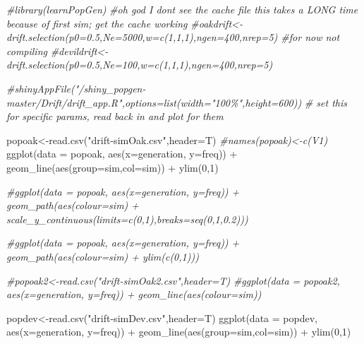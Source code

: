 \documentclass[
]{article}
\newenvironment{Shaded}{\begin{snugshade}}{\end{snugshade}}
\newcommand{\AttributeTok}[1]{\textcolor[rgb]{0.77,0.63,0.00}{#1}}
\newcommand{\CommentTok}[1]{\textcolor[rgb]{0.56,0.35,0.01}{\textit{#1}}}
\newcommand{\DecValTok}[1]{\textcolor[rgb]{0.00,0.00,0.81}{#1}}
\newcommand{\FunctionTok}[1]{\textcolor[rgb]{0.00,0.00,0.00}{#1}}
\newcommand{\NormalTok}[1]{#1}
\newcommand{\OtherTok}[1]{\textcolor[rgb]{0.56,0.35,0.01}{#1}}
\newcommand{\SpecialCharTok}[1]{\textcolor[rgb]{0.00,0.00,0.00}{#1}}
\newcommand{\StringTok}[1]{\textcolor[rgb]{0.31,0.60,0.02}{#1}}
\begin{document}
\begin{Shaded}
\begin{Highlighting}[]
\CommentTok{\#library(learnPopGen)}
\CommentTok{\#oh god I don\textquotesingle{}t see the cache file this takes a LONG time because of first sim; get the cache working}
\CommentTok{\#oakdrift\textless{}{-}drift.selection(p0=0.5,Ne=5000,w=c(1,1,1),ngen=400,nrep=5) \#for now not compiling}
\CommentTok{\#devildrift\textless{}{-}drift.selection(p0=0.5,Ne=100,w=c(1,1,1),ngen=400,nrep=5)}

\CommentTok{\#shinyAppFile("/shiny\_popgen{-}master/Drift/drift\_app.R",options=list(width="100\%",height=600))}
\CommentTok{\# set this for specific params, read back in and plot for them}

\NormalTok{popoak}\OtherTok{\textless{}{-}}\FunctionTok{read.csv}\NormalTok{(}\StringTok{"drift{-}simOak.csv"}\NormalTok{,}\AttributeTok{header=}\NormalTok{T)}
\CommentTok{\#names(popoak)\textless{}{-}c(\textquotesingle{}V1\textquotesingle{})}
\FunctionTok{ggplot}\NormalTok{(}\AttributeTok{data =}\NormalTok{ popoak, }\FunctionTok{aes}\NormalTok{(}\AttributeTok{x=}\NormalTok{generation, }\AttributeTok{y=}\NormalTok{freq)) }\SpecialCharTok{+} \FunctionTok{geom\_line}\NormalTok{(}\FunctionTok{aes}\NormalTok{(}\AttributeTok{group=}\NormalTok{sim,}\AttributeTok{col=}\NormalTok{sim)) }\SpecialCharTok{+} \FunctionTok{ylim}\NormalTok{(}\DecValTok{0}\NormalTok{,}\DecValTok{1}\NormalTok{) }

\CommentTok{\#ggplot(data = popoak, aes(x=generation, y=freq)) + geom\_path(aes(colour=sim) + scale\_y\_continuous(limits=c(0,1),breaks=seq(0,1,0.2)))}

\CommentTok{\#ggplot(data = popoak, aes(x=generation, y=freq)) + geom\_path(aes(colour=sim) + ylim(c(0,1)))}

\CommentTok{\#popoak2\textless{}{-}read.csv("drift{-}simOak2.csv",header=T)}
\CommentTok{\#ggplot(data = popoak2, aes(x=generation, y=freq)) + geom\_line(aes(colour=sim))}

\NormalTok{popdev}\OtherTok{\textless{}{-}}\FunctionTok{read.csv}\NormalTok{(}\StringTok{"drift{-}simDev.csv"}\NormalTok{,}\AttributeTok{header=}\NormalTok{T)}
\FunctionTok{ggplot}\NormalTok{(}\AttributeTok{data =}\NormalTok{ popdev, }\FunctionTok{aes}\NormalTok{(}\AttributeTok{x=}\NormalTok{generation, }\AttributeTok{y=}\NormalTok{freq)) }\SpecialCharTok{+} \FunctionTok{geom\_line}\NormalTok{(}\FunctionTok{aes}\NormalTok{(}\AttributeTok{group=}\NormalTok{sim,}\AttributeTok{col=}\NormalTok{sim)) }\SpecialCharTok{+} \FunctionTok{ylim}\NormalTok{(}\DecValTok{0}\NormalTok{,}\DecValTok{1}\NormalTok{)}
\end{Highlighting}
\end{Shaded}
\end{document}
